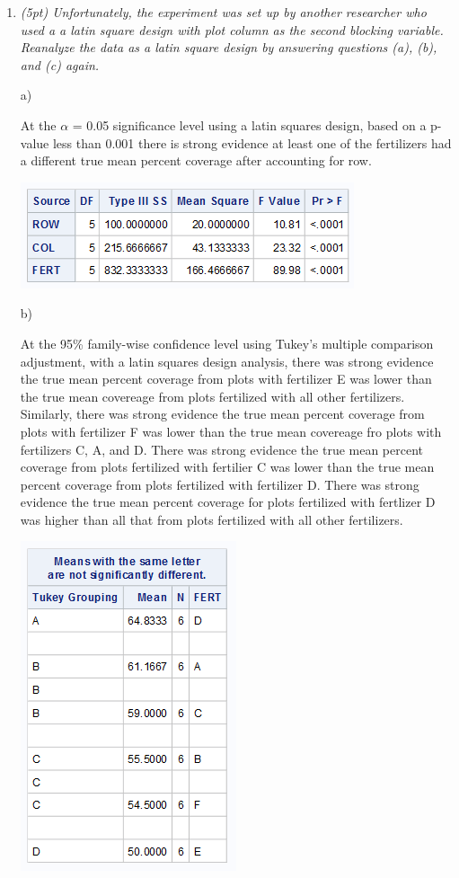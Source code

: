 \documentclass{article}\usepackage[]{graphicx}\usepackage[]{color}
\begin{document}
\begin{enumerate}
\begin{enumerate}
\item
{\it (5pt) Unfortunately, the experiment was set up by another researcher who used a a latin square design with plot column as the second blocking variable. Reanalyze the data as a latin square design by answering questions (a), (b), and (c) again.}

a)

At the $\alpha$ = 0.05 significance level using a latin squares design, based on a p-value less than 0.001 there is strong evidence at least one of the fertilizers had a different true mean percent coverage after accounting for row.

\begin{center}
\includegraphics{latin1a}
\end{center}

\newpage

b)

At the 95\% family-wise confidence level using Tukey's multiple comparison adjustment, with a latin squares design analysis, there was strong evidence the true mean percent coverage from plots with fertilizer E was lower than the true mean covereage from plots fertilized with all other fertilizers. Similarly, there was strong evidence the true mean percent coverage from plots with fertilizer F was lower than the true mean covereage fro plots with fertilizers C, A, and D. There was strong evidence the true mean percent coverage from plots fertilized with fertilier C was lower than the true mean percent coverage from plots fertilized with fertilizer D. There was strong evidence the true mean percent coverage for plots fertilized with fertlizer D was higher than all that from plots fertilized with all other fertilizers.

\begin{center}
\includegraphics{latin1b}
\end{center}


\end{enumerate}
\end{enumerate}
\end{document}

